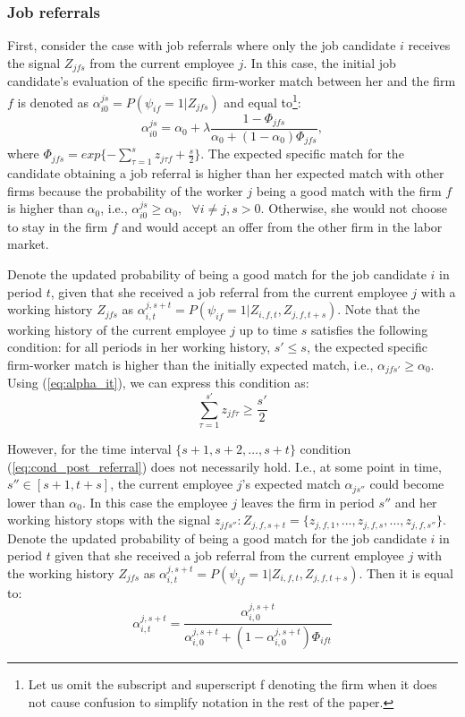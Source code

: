\documentclass[12pt]{article}
\begin{document}
\subsubsection{Job referrals}
First, consider the case with job referrals where only the job candidate $i$ receives the signal $Z_{jfs}$ from the current employee $j$. In this case, the initial job candidate's evaluation of the specific firm-worker match between her and the firm $f$ is denoted as $\alpha_{i0}^{js}=P(\psi_{if}=1\vert Z_{jfs})$ and equal to\footnote{Let us omit the subscript and superscript f denoting the firm when it does not cause confusion to simplify notation in the rest of the paper.}:
\begin{equation}\label{eq:alpha_i0_js}
\alpha_{i0}^{js}= \alpha_0+ \lambda \frac{1-\Phi_{jfs}}{\alpha_0+(1-\alpha_0 ) \Phi_{jfs}}, 
\end{equation}
where  $\Phi_{jfs} = exp\lbrace-\sum_{\tau = 1}^{s} z_{j \tau f}+\frac{s}{2}\rbrace$. The expected specific match for the candidate obtaining a job referral is higher than her expected match with other firms because the  probability of the worker $j$ being a good match with the firm $f$ is higher than $\alpha_0$, i.e., $\alpha_{i0}^{js}\geq \alpha_0,\text{ } \forall i\neq j,s>0.$ Otherwise, she would not choose to stay in the firm $f$ and would accept an offer from the other firm in the labor market. 

Denote the updated probability of being a good match for the job candidate $i$ in period $t$, given that she received a job referral from the current employee $j$ with a working history $Z_{jfs}$ as $\alpha_{i,t}^{j,s+t}=P(\psi_{if}=1\vert Z_{i,f,t},Z_{j,f,t+s})$. Note that the working history of the current employee $j$ up to time $s$ satisfies the following condition: for all periods in her working history, $s'\leq s$, the expected specific firm-worker match is higher than the initially expected match, i.e., $\alpha_{jfs'}\geq \alpha_0$. Using (\ref{eq:alpha_it}), we can express this condition as: 
\begin{equation}\label{eq:cond_post_referral}
\sum_{\tau = 1}^{s'} z_{jf\tau} \geq \frac{s'}{2}
\end{equation} 

However, for the time interval $\lbrace s+1,s+2,…,s+t \rbrace$ condition (\ref{eq:cond_post_referral}) does not necessarily hold. I.e., at some point in time, $s''\in [s+1,t+s]$, the current employee $j$’s expected match $\alpha_{js''}$ could become lower than $\alpha_0$. In this case the employee $j$ leaves the firm in period $s''$ and her working history stops with the signal $z_{jfs''}: Z_{j,f,s+t}=\lbrace z_{j,f,1},...,z_{j,f,s},...,z_{j,f,s''}\rbrace$. Denote the updated probability of being a good match for the job candidate $i$ in period $t$ given that she received a job referral from the current employee $j$ with the working history $Z_{jfs}$ as $\alpha_{i,t}^{j,s+t}=P(\psi_{if}=1\vert Z_{i,f,t},Z_{j,f,t+s})$. Then it is equal to:
\begin{equation}\label{eq:alpha_it_js+t}
\alpha_{i,t}^{j,s+t}=  \frac{\alpha_{i,0}^{j,s+t}}{\alpha_{i,0}^{j,s+t}+(1-\alpha_{i,0}^{j,s+t}) \Phi_{ift}}
\end{equation}
\end{document}
